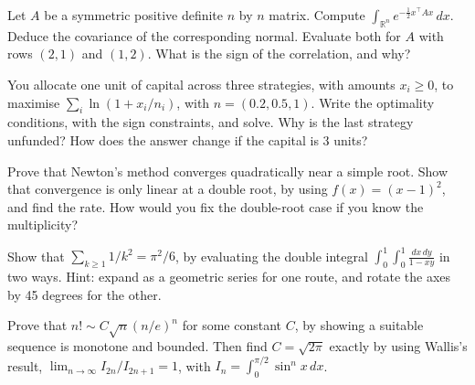 \begin{question}\label{iq:iv1:calculus-and-optimisation:16}
Let $A$ be a symmetric positive definite $n$ by $n$ matrix. Compute $\int_{\mathbb{R}^n} e^{-\frac12 x^\top Ax}\,dx$. Deduce the covariance of the corresponding normal. Evaluate both for $A$ with rows $(2, 1)$ and $(1, 2)$. What is the sign of the correlation, and why?
\end{question}

\begin{question}\label{iq:iv1:calculus-and-optimisation:17}
You allocate one unit of capital across three strategies, with amounts $x_i \ge 0$, to maximise $\sum_i \ln(1 + x_i/n_i)$, with $n = (0.2, 0.5, 1)$. Write the optimality conditions, with the sign constraints, and solve. Why is the last strategy unfunded? How does the answer change if the capital is 3 units?
\end{question}

\begin{question}\label{iq:iv1:calculus-and-optimisation:18}
Prove that Newton's method converges quadratically near a simple root. Show that convergence is only linear at a double root, by using $f(x) = (x - 1)^2$, and find the rate. How would you fix the double-root case if you know the multiplicity?
\end{question}

\begin{question}\label{iq:iv1:calculus-and-optimisation:19}
Show that $\sum_{k \ge 1} 1/k^2 = \pi^2/6$, by evaluating the double integral $\int_0^1\int_0^1 \frac{dx\,dy}{1 - xy}$ in two ways. Hint: expand as a geometric series for one route, and rotate the axes by 45 degrees for the other.
\end{question}

\begin{question}\label{iq:iv1:calculus-and-optimisation:20}
Prove that $n! \sim C\sqrt{n}(n/e)^n$ for some constant $C$, by showing a suitable sequence is monotone and bounded. Then find $C = \sqrt{2\pi}$ exactly by using Wallis's result, $\lim_{n \to \infty} I_{2n}/I_{2n + 1} = 1$, with $I_n = \int_0^{\pi/2} \sin^n x\,dx$.
\end{question}
